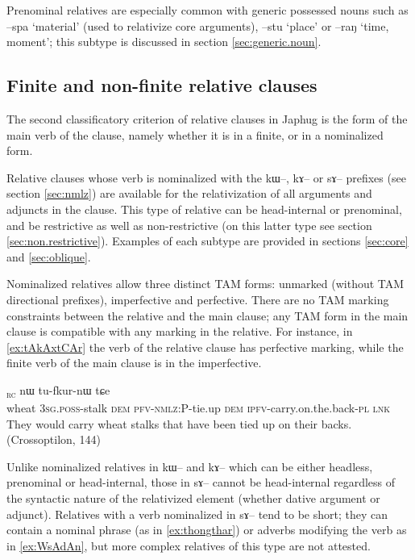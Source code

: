 \documentclass[oldfontcommands,oneside,a4paper,11pt]{article}
\newcommand{\ipa}[1]{{\phon #1}} %
\newcommand{\topic}{\textsc{dem}}
\newcommand{\tete}{\textsuperscript{\textsc{head}}}
\newcommand{\rc}{\textsubscript{\textsc{rc}}}
\begin{document}
Prenominal relatives are especially common with generic possessed nouns such as \ipa{--spa} `material' (used to relativize core arguments), \ipa{--stu} `place' or \ipa{--raŋ} `time, moment'; this subtype is discussed in section \ref{sec:generic.noun}.


\subsection{Finite and non-finite relative clauses} \label{sec:nmlz.vs.n.nmlz}

The second classificatory criterion of relative clauses in Japhug is the form of the main verb of the clause, namely whether it is in a finite, or in a nominalized form.


Relative clauses whose verb is nominalized with the \ipa{kɯ}--, \ipa{kɤ}-- or \ipa{sɤ}-- prefixes (see section \ref{sec:nmlz}) are available for the relativization of all arguments and adjuncts in the clause. This type of relative can be head-internal or prenominal, and be restrictive as well as non-restrictive (on this latter type see section \ref{sec:non.restrictive}). Examples of each subtype are provided in sections \ref{sec:core} and \ref{sec:oblique}.

Nominalized relatives allow three distinct TAM forms: unmarked (without TAM directional prefixes), imperfective and perfective. There are no  TAM marking constraints between the relative and the main clause; any TAM form in the main clause is compatible with any marking in the relative. For instance, in \ref{ex:tAkAxtCAr} the verb of the relative clause has perfective marking, while the finite verb of the main clause is in the imperfective. 

 
\begin{exe}
\ex \label{ex:tAkAxtCAr}
\gll
	[\textbf{\ipa{qɤj}}  	\textbf{\ipa{ɯ-ru}}\tete{}  	\ipa{nɯnɯ}  	\ipa{tɤ-kɤ-xtɕɤr}]\rc{}  	\ipa{nɯ}  	\ipa{tu-fkur-nɯ}  	\ipa{tɕe}  \\
wheat	\textsc{3sg.poss}-stalk \topic{} \textsc{pfv-nmlz:P}-tie.up \topic{} \textsc{ipfv}-carry.on.the.back-\textsc{pl} \textsc{lnk} \\
	\glt They would carry  wheat stalks that have been tied up on their backs.	(Crossoptilon, 144)
	  \end{exe} 

 
Unlike nominalized relatives in \ipa{kɯ}-- and \ipa{kɤ}-- which can be either headless, prenominal or head-internal, those in \ipa{sɤ}-- cannot be head-internal regardless of the syntactic nature of the relativized element (whether dative argument or adjunct). Relatives with a verb nominalized in \ipa{sɤ}-- tend to be short; they can contain a nominal phrase (as in  \ref{ex:thongthar}) or adverbs modifying the verb as in \ref{ex:WsAdAn}, but more complex relatives of this type are not attested.
 
\end{document}
